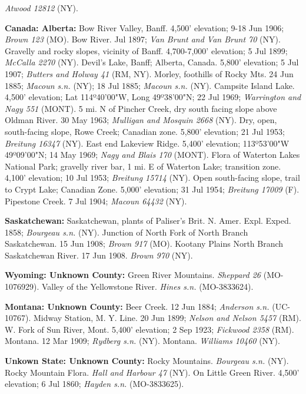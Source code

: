 \textit{Atwood 12812} (NY).  

\textbf{Canada: Alberta:} Bow River Valley, Banff. 4,500' elevation; 9-18 Jun 1906; \textit{Brown 123} (MO).  Bow River. Jul 1897; \textit{Van Brunt and Van Brunt 70} (NY).  Gravelly and rocky slopes, vicinity of Banff. 4,700-7,000' elevation; 5 Jul 1899; \textit{McCalla 2270} (NY).  Devil's Lake, Banff; Alberta, Canada. 5,800' elevation; 5 Jul 1907; \textit{Butters and Holway 41} (RM, NY).  Morley, foothills of Rocky Mts. 24 Jun 1885; \textit{Macoun s.n.} (NY); 18 Jul 1885; \textit{Macoun s.n.} (NY).  Campsite Island Lake. 4,500' elevation; Lat 114º40'00"W, Long 49º38'00"N; 22 Jul 1969; \textit{Warrington and Nagy 551} (MONT).  5 mi. N of Pincher Creek, dry south facing slope above Oldman River. 30 May 1963; \textit{Mulligan and Mosquin 2668} (NY).  Dry, open, south-facing slope, Rowe Creek; Canadian zone. 5,800' elevation; 21 Jul 1953; \textit{Breitung 16347} (NY).  East end Lakeview Ridge. 5,400' elevation; 113º53'00"W 49º09'00"N; 14 May 1969; \textit{Nagy and Blais 170} (MONT).  Flora of Waterton Lakes National Park; gravelly river bar, 1 mi. E of Waterton Lake; transition zone. 4,100' elevation; 10 Jul 1953; \textit{Breitung 15714} (NY).  Open south-facing slope, trail to Crypt Lake; Canadian Zone. 5,000' elevation; 31 Jul 1954; \textit{Breitung 17009} (F).  Pipestone Creek. 7 Jul 1904; \textit{Macoun 64432} (NY).

\textbf{Saskatchewan:} Saskatchewan, plants of Paliser's Brit. N. Amer. Expl. Exped. 1858; \textit{Bourgeau s.n.} (NY).  Junction of North Fork of North Branch Saskatchewan. 15 Jun 1908; \textit{Brown 917} (MO).  Kootany Plains North Branch Saskatchewan River. 17 Jun 1908. \textit{Brown 970} (NY).


\textbf{Wyoming: Unknown County:} Green River Mountains. \textit{Sheppard 26} (MO-1076929).  Valley of the Yellowstone River. \textit{Hines s.n.} (MO-3833624).  

\textbf{Montana: Unknown County:} Beer Creek. 12 Jun 1884; \textit{Anderson s.n.} (UC-10767).  Midway Station, M. Y. Line. 20 Jun 1899; \textit{Nelson and Nelson 5457} (RM).  W. Fork of Sun River, Mont. 5,400' elevation; 2 Sep 1923; \textit{Fickwood 2358} (RM).  Montana. 12 Mar 1909; \textit{Rydberg s.n.} (NY).  Montana. \textit{Williams 10460} (NY).  

\textbf{Unkown State: Unknown County:} Rocky Mountains. \textit{Bourgeau s.n.} (NY).  Rocky Mountain Flora. \textit{Hall and Harbour 47} (NY).  On Little Green River. 4,500' elevation; 6 Jul 1860; \textit{Hayden s.n.} (MO-3833625).  




